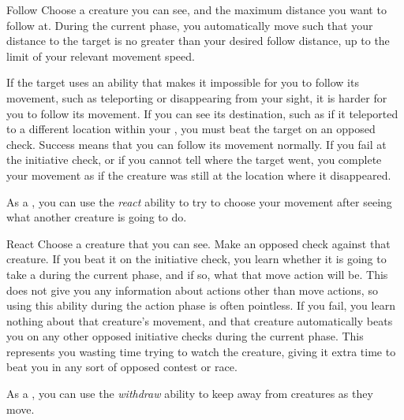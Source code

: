         \begin{activeability}{Follow}
            \label{Follow}
            \rankline
            Choose a creature you can see, and the maximum distance you want to follow at.
            During the current phase, you automatically move such that your distance to the target is no greater than your desired follow distance, up to the limit of your relevant movement speed.

            If the target uses an ability that makes it impossible for you to follow its movement, such as teleporting or disappearing from your sight, it is harder for you to follow its movement.
            If you can see its destination, such as if it teleported to a different location within your , you must beat the target on an opposed  check.
            Success means that you can follow its movement normally.
            If you fail at the initiative check, or if you cannot tell where the target went, you complete your movement as if the creature was still at the location where it disappeared.
        \end{activeability}

         As a , you can use the \textit{react} ability to try to choose your movement after seeing what another creature is going to do.

        \begin{activeability}{React}
            \label{React}
            \rankline
            Choose a creature that you can see.
            Make an opposed  check against that creature.
            If you beat it on the initiative check, you learn whether it is going to take a  during the current phase, and if so, what that move action will be.
            This does not give you any information about actions other than move actions, so using this ability during the action phase is often pointless.
            If you fail, you learn nothing about that creature's movement, and that creature automatically beats you on any other opposed initiative checks during the current phase.
            This represents you wasting time trying to watch the creature, giving it extra time to beat you in any sort of opposed contest or race.
        \end{activeability}

         As a , you can use the \textit{withdraw} ability to keep away from creatures as they move.

